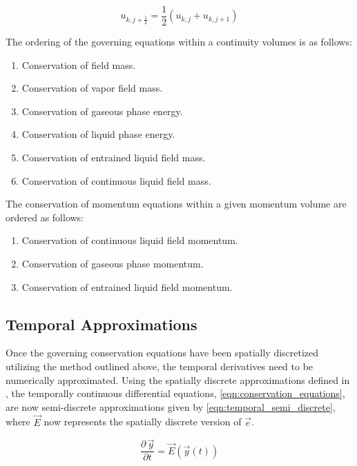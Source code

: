 \begin{equation}
\label{eqn:average_advecting_vel}
u_{k,j+\frac{1}{2}} = \frac{1}{2}\left(u_{k,j} + u_{k, j+1}\right)
\end{equation}

The ordering of the governing equations within a continuity volumes is as follows:

\begin{enumerate}
\item{Conservation of \ncg{} field mass.}
\item{Conservation of vapor field mass.}
\item{Conservation of gaseous phase energy.}
\item{Conservation of liquid phase energy.}
\item{Conservation of entrained liquid field mass.}
\item{Conservation of continuous liquid field mass.}
\end{enumerate}

The conservation of momentum equations within a given momentum volume are ordered as follows:

\begin{enumerate}
\item{Conservation of continuous liquid field momentum.}
\item{Conservation of gaseous phase momentum.}
\item{Conservation of entrained liquid field momentum.}
\end{enumerate}

\subsection{Temporal Approximations}
\label{subsect:temporal_approx}

Once the governing conservation equations have been spatially discretized utilizing the method outlined above, the temporal derivatives need to be numerically approximated.
Using the spatially discrete approximations defined in , the temporally continuous differential equations, \eqref{eqn:conservation_equations}, are now semi-discrete approximations given by \eqref{eqn:temporal_semi_discrete}, where $\vec{E}$ now represents the spatially discrete version of $\vec{e}$.

\begin{equation}
\label{eqn:temporal_semi_discrete}
\frac{\partial \,\vec{y} }{\partial t} = \vec{E}(\vec{y}(t))
\end{equation}

